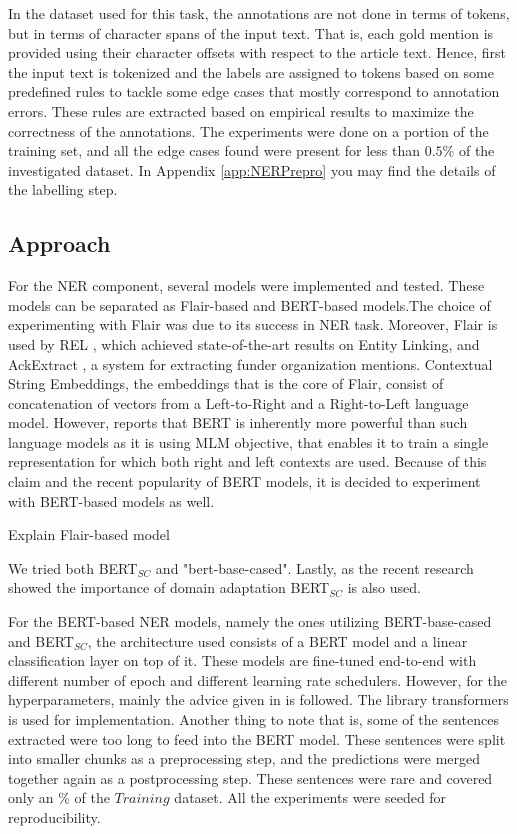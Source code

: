 \documentclass{report}
\theoremstyle{definition}
\theoremstyle{remark}
\begin{document}
In the dataset used for this task, the annotations are not done in terms of tokens, but in terms of character spans of the input text. That is, each gold mention is provided using their character offsets with respect to the article text. Hence, first the input text is tokenized and the labels are assigned to tokens based on some predefined rules to tackle some edge cases that mostly correspond to annotation errors. These rules are extracted based on empirical results to maximize the correctness of the annotations. The experiments were done on a portion of the training set, and all the edge cases found were present for less than $0.5\%$ of the investigated dataset. In Appendix \ref{app:NERPrepro} you may find the details of the labelling step.

\subsection{Approach}
\label{sec:NERmodels}

For the NER component, several models were implemented and tested. These models can be separated as Flair-based \cite{flairpaper} and  BERT-based \cite{BERT} models.The choice of experimenting with Flair was due to its success in NER task. Moreover, Flair is used by REL \cite{REL}, which achieved state-of-the-art results on Entity Linking,  and AckExtract \cite{AckExtract}, a system for extracting funder organization mentions. Contextual String Embeddings, the embeddings that is the core of Flair, consist of concatenation of vectors from a Left-to-Right and a Right-to-Left language model. However, \cite{BERT} reports that BERT is inherently more powerful than such language models as it is using MLM objective, that enables it to train a single representation for which both right and left contexts are used. Because of this claim and the recent popularity of BERT models, it is decided to experiment with BERT-based models as well.

Explain Flair-based model

We tried both BERT$_{SC}$ and "bert-base-cased".  Lastly, as the recent research showed the importance of domain adaptation \textcolor{red}{\cite{}} BERT$_{SC}$ is also used. 




For the BERT-based NER models, namely the ones utilizing BERT-base-cased and BERT$_{SC}$, the architecture used consists of a BERT model and a linear classification layer on top of it. These models are fine-tuned end-to-end with different number of epoch and different learning rate schedulers. However, for the hyperparameters, mainly the advice given in \cite{BERT} is followed. The library transformers \textcolor{red}{\cite{}} is used for implementation. Another thing to note that is, some of the sentences extracted were too long to feed into the BERT model.  These sentences were split into smaller chunks as a preprocessing step, and the predictions were merged together again as a postprocessing step. These sentences were rare and covered only an  \textcolor{red}{\cite{}} \% of the $Training$ dataset. All the experiments were seeded for reproducibility.
\end{document}

